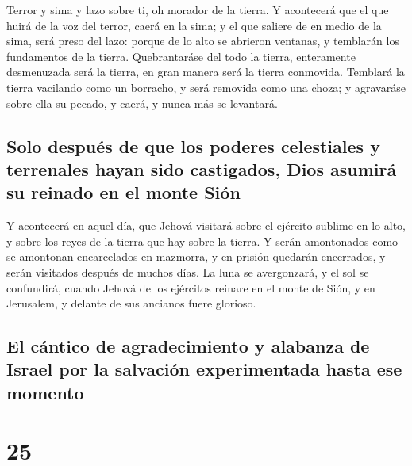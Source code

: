  Terror y sima y lazo sobre ti, oh morador de la tierra.
 Y acontecerá que el que huirá de la voz del terror,
caerá en la sima; y el que saliere de en medio de la sima, será preso
del lazo: porque de lo alto se abrieron ventanas, y temblarán los
fundamentos de la tierra.  Quebrantaráse del todo la
tierra, enteramente desmenuzada será la tierra, en gran manera será la
tierra conmovida.  Temblará la tierra vacilando como un
borracho, y será removida como una choza; y agravaráse sobre ella su
pecado, y caerá, y nunca más se levantará.

\hypertarget{solo-despuuxe9s-de-que-los-poderes-celestiales-y-terrenales-hayan-sido-castigados-dios-asumiruxe1-su-reinado-en-el-monte-siuxf3n}{%
\subsection{Solo después de que los poderes celestiales y terrenales
hayan sido castigados, Dios asumirá su reinado en el monte
Sión}\label{solo-despuuxe9s-de-que-los-poderes-celestiales-y-terrenales-hayan-sido-castigados-dios-asumiruxe1-su-reinado-en-el-monte-siuxf3n}}

 Y acontecerá en aquel día, que Jehová visitará sobre el
ejército sublime en lo alto, y sobre los reyes de la tierra que hay
sobre la tierra.  Y serán amontonados como se amontonan
encarcelados en mazmorra, y en prisión quedarán encerrados, y serán
visitados después de muchos días.  La luna se
avergonzará, y el sol se confundirá, cuando Jehová de los ejércitos
reinare en el monte de Sión, y en Jerusalem, y delante de sus ancianos
fuere glorioso.

\hypertarget{el-cuxe1ntico-de-agradecimiento-y-alabanza-de-israel-por-la-salvaciuxf3n-experimentada-hasta-ese-momento}{%
\subsection{El cántico de agradecimiento y alabanza de Israel por la
salvación experimentada hasta ese
momento}\label{el-cuxe1ntico-de-agradecimiento-y-alabanza-de-israel-por-la-salvaciuxf3n-experimentada-hasta-ese-momento}}

\hypertarget{section-24}{%
\section{25}\label{section-24}}

